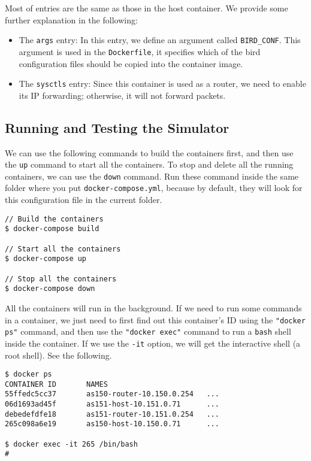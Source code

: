 Most of entries are the same as those in
the host container. We provide some further explanation in the following:

\begin{itemize}
\item The \texttt{args} entry: In this entry, we define an argument 
called \texttt{BIRD\_CONF}. This argument is used in the \texttt{Dockerfile},
it specifies which of the bird configuration files 
should be copied into the container image. 

\item The \texttt{sysctls} entry: Since this container is used as a 
router, we need to enable its IP forwarding; otherwise, it will not 
forward packets. 
\end{itemize}



\subsection{Running and Testing the Simulator}


We can use the following commands to build the containers first, and then
use the \texttt{up} command to start all the containers. To 
stop and delete all the running containers, 
we can use the \texttt{down} command. Run these command inside the 
same folder where you put \texttt{docker-compose.yml}, because by
default, they will look for this configuration file in the current folder. 

\begin{lstlisting}
// Build the containers
$ docker-compose build

// Start all the containers
$ docker-compose up

// Stop all the containers 
$ docker-compose down
\end{lstlisting}


All the containers will run in the background. If we need 
to run some commands in a container, we just need to first 
find out this container's ID using the \texttt{"docker ps"} 
command, and then use the \texttt{"docker exec"} command to
run a \texttt{bash} shell inside the container. If we use
the \texttt{-it} option, we will get the interactive 
shell (a root shell). See the following. 


\begin{lstlisting}
$ docker ps
CONTAINER ID       NAMES
55ffedc5cc37       as150-router-10.150.0.254   ...
06d1693ad45f       as151-host-10.151.0.71      ...
debedefdfe18       as151-router-10.151.0.254   ...
265c098a6e19       as150-host-10.150.0.71      ...

$ docker exec -it 265 /bin/bash
# 
\end{lstlisting}
 


